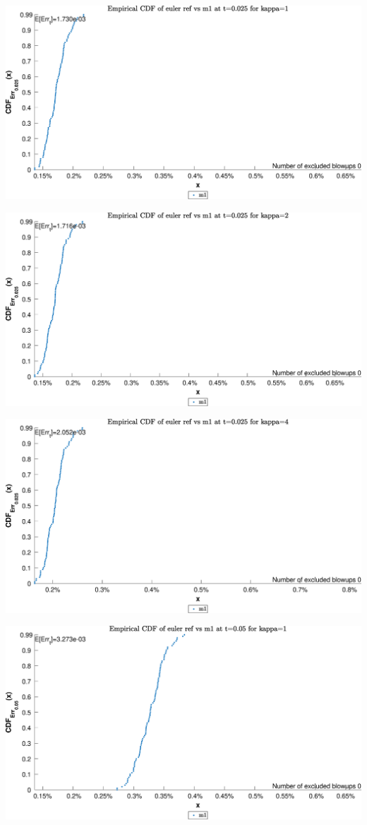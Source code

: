 \begin{landscape}
\includegraphics[width=.95\columnwidth]{CDF/CDFEulerRef_10}
\end{landscape}
\begin{landscape}
\includegraphics[width=.95\columnwidth]{CDF/CDFEulerRef_11}
\end{landscape}
\begin{landscape}
\includegraphics[width=.95\columnwidth]{CDF/CDFEulerRef_12}
\end{landscape}
\begin{landscape}
\includegraphics[width=.95\columnwidth]{CDF/CDFEulerRef_13}
\end{landscape}

